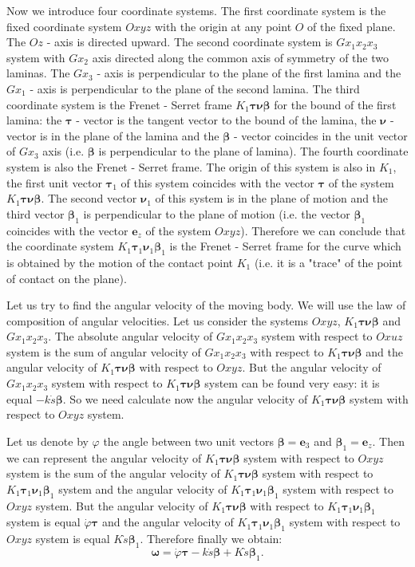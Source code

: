 \documentclass[10pt]{enoc2011}
\renewcommand{\vec}[1]{\boldsymbol{#1}}
\begin{document}
Now we introduce four coordinate systems. The first coordinate system is the fixed coordinate system $Oxyz$ with the origin at any point $O$ of the fixed plane. The $Oz$ - axis is directed upward. The second coordinate system is $Gx_1x_2x_3$ system with $Gx_2$ axis directed along the common axis of symmetry of the two laminas. The $Gx_3$ - axis  is perpendicular to the plane of the first lamina and the $Gx_1$ - axis is perpendicular to the plane of the second lamina. The third coordinate system is the Frenet - Serret frame $K_1\vec\tau\vec\nu\vec\beta$ for the bound of the first lamina: the $\vec\tau$ - vector is the tangent vector to the bound of the lamina, the $\vec\nu$ - vector is in the plane of the lamina and the $\vec\beta$ - vector coincides in the unit vector of $Gx_3$ axis (i.e. $\vec\beta$ is perpendicular to the plane of lamina). The fourth coordinate system is also the Frenet - Serret frame. The origin of this system is also in $K_1$, the first unit vector $\vec\tau_1$ of this system coincides with the vector $\vec\tau$ of the system $K_1\vec\tau\vec\nu\vec\beta$. The second vector $\vec\nu_1$ of this system is in the plane of motion and the third vector $\vec\beta_1$ is perpendicular to the plane of motion (i.e. the vector $\vec\beta_1$ coincides with the vector $\vec e_z$ of the system $Oxyz$). Therefore we can conclude that the coordinate system $K_1\vec\tau_1\vec\nu_1\vec\beta_1$ is the Frenet - Serret frame for the curve which is obtained by the motion of the contact point $K_1$ (i.e. it is a "trace" of the point of contact on the plane).

Let us try to find the angular velocity of the moving body. We will use the law of composition of angular velocities. Let us consider the systems $Oxyz$, $K_1\vec\tau\vec\nu\vec\beta$ and $Gx_1x_2x_3$. The absolute angular velocity of $Gx_1x_2x_3$ system with respect to $Oxuz$ system is the sum of angular velocity of $Gx_1x_2x_3$ with respect to $K_1\vec\tau\vec\nu\vec\beta$ and the angular velocity of $K_1\vec\tau\vec\nu\vec\beta$ with respect to $Oxyz$. But the angular velocity of $Gx_1x_2x_3$ system with respect to $K_1\vec\tau\vec\nu\vec\beta$ system can be found very easy: it is equal $-k\dot{s}\vec\beta$. So we need calculate now the angular velocity of $K_1\vec\tau\vec\nu\vec\beta$ system with respect to $Oxyz$ system.

Let us denote by $\varphi$ the angle between two unit vectors $\vec\beta=\vec e_3$ and $\vec\beta_1=\vec e_z$. Then we can represent the angular velocity of $K_1\vec\tau\vec\nu\vec\beta$ system with respect to $Oxyz$ system is the sum of the angular velocity of $K_1\vec\tau\vec\nu\vec\beta$ system with respect to $K_1\vec\tau_1\vec\nu_1\vec\beta_1$ system and the angular velocity of $K_1\vec\tau_1\vec\nu_1\vec\beta_1$ system with respect to $Oxyz$ system. But the angular velocity of $K_1\vec\tau\vec\nu\vec\beta$ with respect to $K_1\vec\tau_1\vec\nu_1\vec\beta_1$ system is equal $\dot{\varphi}\vec\tau$ and the angular velocity of $K_1\vec\tau_1\vec\nu_1\vec\beta_1$ system with respect to $Oxyz$ system is equal $K\dot{s}\vec\beta_1$. Therefore finally we obtain:
$$
\vec\omega=\dot{\varphi}\vec\tau-k\dot{s}\vec\beta+K\dot{s}\vec\beta_1.
$$
\end{document}
